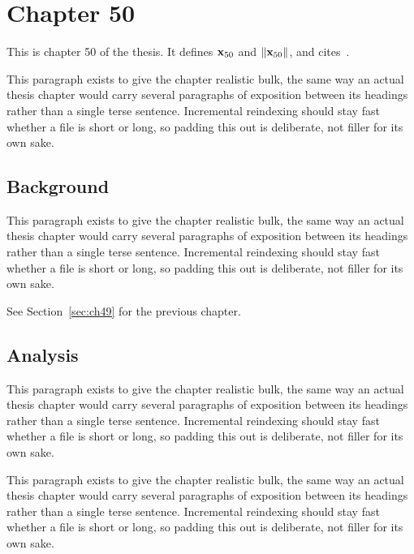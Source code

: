 \section{Chapter 50}
\label{sec:ch50}

This is chapter 50 of the thesis. It defines $\mathbf{x}_{50}$ and $\lVert \mathbf{x}_{50} \rVert$, and cites~\cite{ref1}.

This paragraph exists to give the chapter realistic bulk, the same way an actual thesis chapter would carry several paragraphs of exposition between its headings rather than a single terse sentence. Incremental reindexing should stay fast whether a file is short or long, so padding this out is deliberate, not filler for its own sake.

\subsection{Background}
\label{sec:ch50:background}

This paragraph exists to give the chapter realistic bulk, the same way an actual thesis chapter would carry several paragraphs of exposition between its headings rather than a single terse sentence. Incremental reindexing should stay fast whether a file is short or long, so padding this out is deliberate, not filler for its own sake.

See Section~\ref{sec:ch49} for the previous chapter.

\subsection{Analysis}
\label{sec:ch50:analysis}

This paragraph exists to give the chapter realistic bulk, the same way an actual thesis chapter would carry several paragraphs of exposition between its headings rather than a single terse sentence. Incremental reindexing should stay fast whether a file is short or long, so padding this out is deliberate, not filler for its own sake.

This paragraph exists to give the chapter realistic bulk, the same way an actual thesis chapter would carry several paragraphs of exposition between its headings rather than a single terse sentence. Incremental reindexing should stay fast whether a file is short or long, so padding this out is deliberate, not filler for its own sake.

